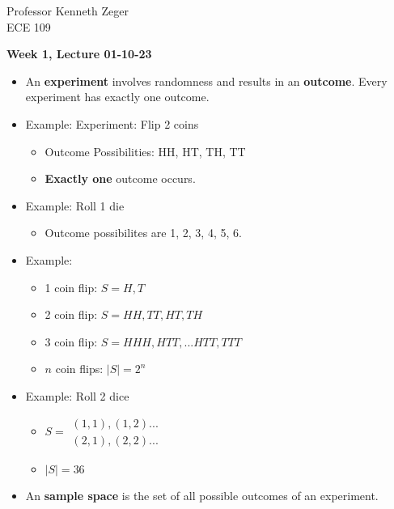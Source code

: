 \documentclass[10pt]{article}
\begin{document}
\begin{flushleft}
    Professor Kenneth Zeger \\
	ECE 109 \\
\end{flushleft}

\begin{center}
	\Large \textbf{Week 1, Lecture 01-10-23}
\end{center}
\normalsize

\begin{itemize}
    \item 
An \textbf{experiment} involves randomness and results in an \textbf{outcome}. Every experiment has exactly one outcome.
    \item Example: Experiment: Flip 2 coins
        \begin{itemize}
            \item Outcome Possibilities: HH, HT, TH, TT
            \item \textbf{Exactly one} outcome occurs.
        \end{itemize}
    \item Example: Roll 1 die
        \begin{itemize}
            \item Outcome possibilites are 1, 2, 3, 4, 5, 6.
        \end{itemize}
    \item Example: 
        \begin{itemize}
            \item 1 coin flip: $S = {H, T}$
            \item 2 coin flip: $S = {HH, TT, HT, TH}$
            \item 3 coin flip: $S = {HHH, HTT, ... HTT, TTT}$
            \item $n$ coin flips: $|S| = 2^n$
        \end{itemize}
    \item Example: Roll 2 dice 
        \begin{itemize}
            \item $ S = 
    \begin{array}{lr}
        (1,1), (1,2) ...\\
        (2,1), (2,2) ... 
    \end{array}
    $
            \item $|S| = 36$
        \end{itemize}
    \item An \textbf{sample space} is the set of all possible outcomes of an experiment.

\end{itemize}
\end{document}
